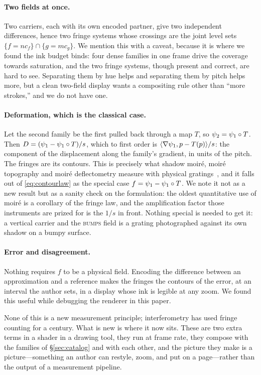 \paragraph{Two fields at once.} Two carriers, each with its own encoded partner,
give two independent differences, hence two fringe systems whose crossings are
the joint level sets $\{f=nc_f\}\cap\{g=mc_g\}$. We mention this
with a caveat, because it is where we found the ink budget binds: four dense
families in one frame drive the coverage towards saturation, and the two fringe
systems, though present and correct, are hard to see. Separating them by hue
helps and separating them by pitch helps more, but a clean two-field display
wants a compositing rule other than ``more strokes,'' and we do not have one.

\paragraph{Deformation, which is the classical case.} Let the second family be
the first pulled back through a map $T$, so $\psi_2=\psi_1\circ T$. Then
$D=(\psi_1-\psi_1\circ T)/s$, which to first order is $\langle \nabla\psi_1,
p-T(p)\rangle/s$: the component of the displacement along the family's gradient,
in units of the pitch. The fringes are its contours. This is precisely what
shadow moir\'e, moir\'e topography and moir\'e deflectometry measure with physical
gratings~\cite{Post1994High, Post2008Moire, Takasaki1970Moire}, and it falls out of
\eqref{eq:contourlaw} as the special case $f=\psi_1-\psi_1\circ T$. We note it not
as a new result but as a sanity check on the formulation: the oldest quantitative
use of moir\'e is a corollary of the fringe law, and the amplification factor those
instruments are prized for is the $1/s$ in front. Nothing special is needed to get
it: a vertical carrier and the \textsc{bumps} field is a grating photographed
against its own shadow on a bumpy surface.

\paragraph{Error and disagreement.} Nothing requires $f$ to be a physical field.
Encoding the difference between an approximation and a reference makes the
fringes the contours of the error, at an interval the author sets, in a display
whose ink is legible at any zoom. We found this useful while
debugging the renderer in this paper.

None of this is a new measurement principle; interferometry has used fringe
counting for a century. What is new is where it now sits. These are two extra
terms in a shader in a drawing tool, they run at frame rate, they compose with the
\patternCount{} families of \S\ref{sec:catalog} and with each other, and the
picture they make is a picture---something an author can restyle, zoom, and
put on a page---rather than the output of a measurement pipeline.
